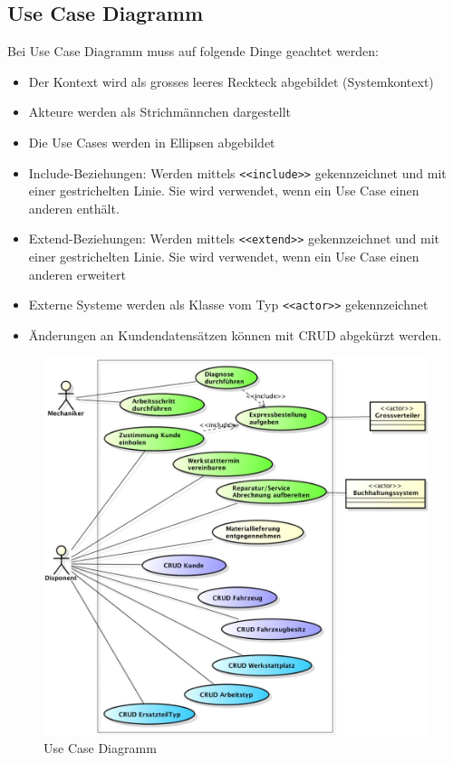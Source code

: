 \clearpage

\subsection{Use Case Diagramm}
Bei Use Case Diagramm muss auf folgende Dinge geachtet werden:
\begin{itemize}
	\item Der Kontext wird als grosses leeres Reckteck abgebildet (Systemkontext)
	\item Akteure werden als Strichmännchen dargestellt
	\item Die Use Cases werden in Ellipsen abgebildet
	\item Include-Beziehungen: Werden mittels \lstinline|<<include>>| gekennzeichnet und mit einer gestrichelten Linie. Sie wird verwendet, wenn ein Use Case einen anderen enthält.
	\item Extend-Beziehungen: Werden mittels \lstinline|<<extend>>| gekennzeichnet und mit einer gestrichelten Linie. Sie wird verwendet, wenn ein Use Case einen anderen erweitert
	\item Externe Systeme werden als Klasse vom Typ \lstinline|<<actor>>| gekennzeichnet
	\item Änderungen an Kundendatensätzen können mit CRUD abgekürzt werden.
\end{itemize}
\begin{figure}[h]
	\centering
	\includegraphics[width=0.7\linewidth]{images/use_case_diagramm}
	\caption{Use Case Diagramm}
	\label{fig:usecasediagramm}
\end{figure}

\clearpage

